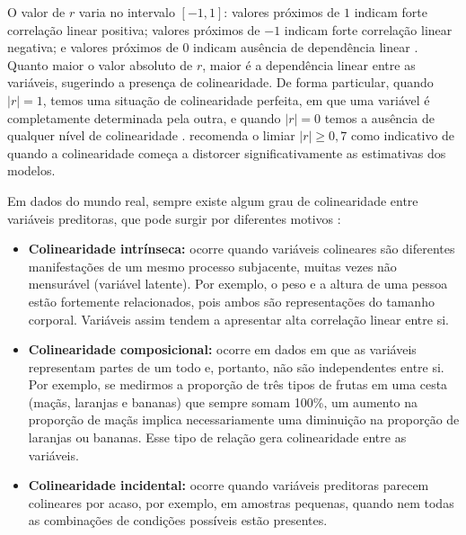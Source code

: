 O valor de $r$ varia no intervalo $[-1,1]$: valores próximos de $1$ indicam forte correlação linear positiva; valores próximos de $-1$ indicam forte correlação linear negativa; e valores próximos de $0$ indicam ausência de dependência linear \cite{PearsonCorrelationCoefficient}. Quanto maior o valor absoluto de $r$, maior é a dependência linear entre as variáveis, sugerindo a presença de colinearidade. De forma particular, quando $|r| = 1$, temos uma situação de colinearidade perfeita, em que uma variável é completamente determinada pela outra, e quando $|r| = 0$ temos a ausência de qualquer nível de colinearidade \cite{kim2019multicollinearity}.  recomenda o limiar $|r| \geq 0{,}7$ como indicativo de quando a colinearidade começa a distorcer significativamente as estimativas dos modelos.

Em dados do mundo real, sempre existe algum grau de colinearidade entre variáveis preditoras, que pode surgir por diferentes motivos \cite{Carsten2012Collinearity}:

\begin{itemize}
	\item \textbf{Colinearidade intrínseca:} ocorre quando variáveis colineares são diferentes manifestações de um mesmo processo subjacente, muitas vezes não mensurável (variável latente). Por exemplo, o peso e a altura de uma pessoa estão fortemente relacionados, pois ambos são representações do tamanho corporal. Variáveis assim tendem a apresentar alta correlação linear entre si.
	
	\item \textbf{Colinearidade composicional:} ocorre em dados em que as variáveis representam partes de um todo e, portanto, não são independentes entre si. Por exemplo, se medirmos a proporção de três tipos de frutas em uma cesta (maçãs, laranjas e bananas) que sempre somam 100\%, um aumento na proporção de maçãs implica necessariamente uma diminuição na proporção de laranjas ou bananas. Esse tipo de relação gera colinearidade entre as variáveis.
	
	\item \textbf{Colinearidade incidental:} ocorre quando variáveis preditoras parecem colineares por acaso, por exemplo, em amostras pequenas, quando nem todas as combinações de condições possíveis estão presentes. 
\end{itemize}






